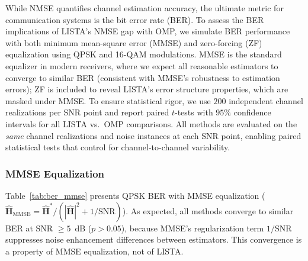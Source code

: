\documentclass[a4paper,fleqn]{cas-sc}
\begin{document}
While NMSE quantifies channel estimation accuracy, the ultimate metric for communication systems is the bit error rate (BER). To assess the BER implications of LISTA's NMSE gap with OMP, we simulate BER performance with both minimum mean-square error (MMSE) and zero-forcing (ZF) equalization using QPSK and 16-QAM modulations. MMSE is the standard equalizer in modern receivers, where we expect all reasonable estimators to converge to similar BER (consistent with MMSE's robustness to estimation errors); ZF is included to reveal LISTA's error structure properties, which are masked under MMSE. To ensure statistical rigor, we use $200$ independent channel realizations per SNR point and report paired $t$-tests with $95\%$ confidence intervals for all LISTA vs.~OMP comparisons. All methods are evaluated on the \emph{same} channel realizations and noise instances at each SNR point, enabling paired statistical tests that control for channel-to-channel variability.

\subsubsection{MMSE Equalization}

Table~\ref{tab:ber_mmse} presents QPSK BER with MMSE equalization ($\hat{\mathbf{H}}_{\text{MMSE}} = \hat{\mathbf{H}}^{\ast} / (|\hat{\mathbf{H}}|^2 + 1/\text{SNR})$). As expected, all methods converge to similar BER at SNR $\geq 5$~dB ($p > 0.05$), because MMSE's regularization term $1/\text{SNR}$ suppresses noise enhancement differences between estimators. This convergence is a property of MMSE equalization, not of LISTA.
\end{document}
